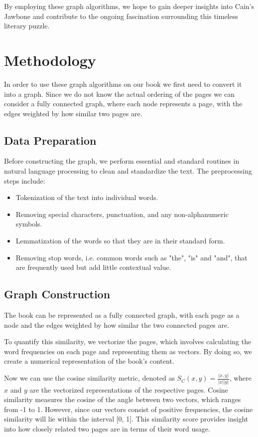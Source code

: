 \documentclass[a4paper]{article}
\begin{document}
By employing these graph algorithms, we hope to gain deeper insights into Cain's Jawbone and contribute to the ongoing fascination surrounding this timeless literary puzzle.


\section{Methodology}

In order to use these graph algorithms on our book we first need to convert it into a graph. Since we do not know the actual ordering of the pages we can consider a fully connected graph, where each node represents a page, with the edges weighted by how similar two pages are.

\subsection{Data Preparation}

Before constructing the graph, we perform essential and standard routines in natural language processing to clean and standardize the text. The preprocessing steps include:

\begin{itemize}
    \item Tokenization of the text into individual words.
    \item Removing special characters, punctuation, and any non-alphanumeric symbols.
    \item Lemmatization of the words so that they are in their standard form.
    \item Removing stop words, i.e. common words such as "the", "is" and "and", that are frequently used but add little contextual value.
\end{itemize}

\subsection{Graph Construction}

The book can be represented as a fully connected graph, with each page as a node and the edges weighted by how similar the two connected pages are.

To quantify this similarity, we vectorize the pages, which involves calculating the word frequencies on each page and representing them as vectors. By doing so, we create a numerical representation of the book's content.

Now we can use the cosine similarity metric, denoted as $S_C(x, y) = \frac{\langle x, y \rangle}{|x| |y|}$, where $x$ and $y$ are the vectorized representations of the respective pages. Cosine similarity measures the cosine of the angle between two vectors, which ranges from -1 to 1. However, since our vectors consist of positive frequencies, the cosine similarity will lie within the interval [0, 1]. This similarity score provides insight into how closely related two pages are in terms of their word usage.
\end{document}
